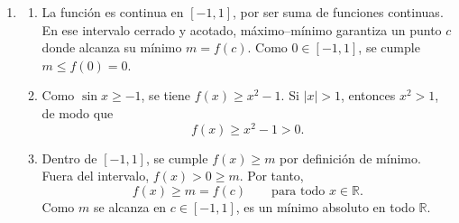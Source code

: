 \documentclass[10pt,a5paper]{article}
\begin{document}
\begin{solucion}
\begin{enumerate}
  \item
  \begin{enumerate}
    \item La función es continua en $[-1,1]$, por ser suma de funciones continuas. En ese intervalo cerrado y acotado, máximo--mínimo garantiza un punto $c$ donde alcanza su mínimo $m=f(c)$. Como $0\in[-1,1]$, se cumple $m\leq f(0)=0$.
    \item Como $\sin x\geq-1$, se tiene $f(x)\geq x^2-1$. Si $|x|>1$, entonces $x^2>1$, de modo que
    \[
      f(x)\geq x^2-1>0.
    \]
    \item Dentro de $[-1,1]$, se cumple $f(x)\geq m$ por definición de mínimo. Fuera del intervalo, $f(x)>0\geq m$. Por tanto,
    \[
      f(x)\geq m=f(c)\qquad\text{para todo }x\in\mathbb{R}.
    \]
    Como $m$ se alcanza en $c\in[-1,1]$, es un mínimo absoluto en todo $\mathbb{R}$.
  \end{enumerate}
\end{enumerate}

\end{solucion}
\fi
\end{document}
